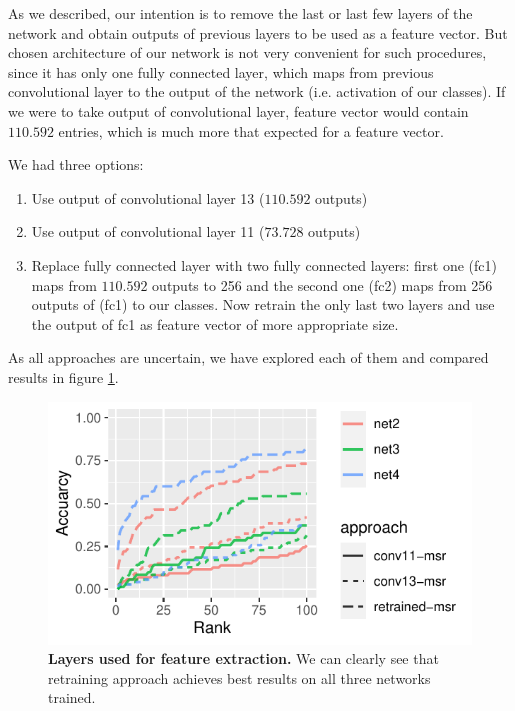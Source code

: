 \documentclass[fleqn,moreauthors,10pt]{ds_report}
\begin{document}
As we described, our intention is to remove the last or last few layers of the network and obtain outputs of previous layers to be used as a feature vector. But chosen architecture of our network is not very convenient for such procedures, since it has only one fully connected layer, which maps from previous convolutional layer to the output of the network (i.e. activation of our classes). If we were to take output of convolutional layer, feature vector would contain $110.592$ entries, which is much more that expected for a feature vector.


We had three options:
\begin{enumerate}
	\itemsep0em
	\item Use output of convolutional layer 13 ($110.592$ outputs)
	\item Use output of convolutional layer 11 ($73.728$ outputs)
	\item Replace fully connected layer with two fully connected layers: first one (fc1) maps from $110.592$ outputs to 256 and the second one (fc2) maps from 256 outputs of (fc1) to our classes. Now retrain the only last two layers and use the output of fc1 as feature vector of more appropriate size.
\end{enumerate}

As all approaches are uncertain, we have explored each of them and compared results in figure \ref{fig:ranks-layer-selection}.

\begin{figure}[htb]\centering
	\includegraphics[width=\linewidth]{ranks-ident-layer-selection.pdf}
	\caption{\textbf{Layers used for feature extraction.} We can clearly see that retraining approach achieves best results on all three networks trained.}
	\label{fig:ranks-layer-selection}
\end{figure}
\end{document}
